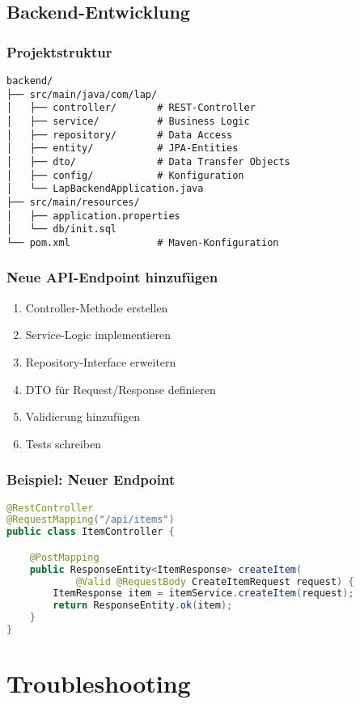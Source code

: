 \documentclass[a4paper,12pt]{article}
\begin{document}
\subsection{Backend-Entwicklung}

\subsubsection{Projektstruktur}
\begin{lstlisting}
backend/
├── src/main/java/com/lap/
│   ├── controller/       # REST-Controller
│   ├── service/          # Business Logic
│   ├── repository/       # Data Access
│   ├── entity/           # JPA-Entities
│   ├── dto/              # Data Transfer Objects
│   ├── config/           # Konfiguration
│   └── LapBackendApplication.java
├── src/main/resources/
│   ├── application.properties
│   └── db/init.sql
└── pom.xml               # Maven-Konfiguration
\end{lstlisting}

\subsubsection{Neue API-Endpoint hinzufügen}
\begin{enumerate}
    \item Controller-Methode erstellen
    \item Service-Logic implementieren
    \item Repository-Interface erweitern
    \item DTO für Request/Response definieren
    \item Validierung hinzufügen
    \item Tests schreiben
\end{enumerate}

\subsubsection{Beispiel: Neuer Endpoint}
\begin{lstlisting}[language=java]
@RestController
@RequestMapping("/api/items")
public class ItemController {

    @PostMapping
    public ResponseEntity<ItemResponse> createItem(
            @Valid @RequestBody CreateItemRequest request) {
        ItemResponse item = itemService.createItem(request);
        return ResponseEntity.ok(item);
    }
}
\end{lstlisting}

\section{Troubleshooting}
\end{document}

